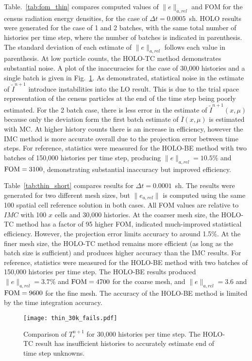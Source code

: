 Table.~\ref{tab:fom_thin} compares computed values of $\|e\|_{a,rel}$ and FOM for the census
radiation energy densities, for the case of $\Delta t =0.0005$~sh.   HOLO results were generated for the case of 1 and 2 batches, with the same
total number of histories per time step, where the number of batches is indicated in
parenthesis. The standard deviation of each estimate of $\|e\|_{a,rel}$ follows each value in parenthesis. 
At low particle counts, the HOLO-TC method demonstrates substantial noise.   
A plot
of the inaccuracies for the case of 30,000 histories and a single batch is given in
Fig.~\ref{fig:30k_fails}.  As demonstrated, statistical noise in the estimate of
$\tilde I^{n+1}$ introduce instabilities into the LO result.
This is due to the trial space representation of the
census particles at the end of the time step being poorly estimated.  For the 2 batch
case, there is less error in the estimate of $\tilde I^{n+1}(x,\mu)$ because only the
deviation form the first batch estimate of $\overline I(x,\mu)$ is estimated with MC. 
At higher history counts there is an increase in efficiency, however the IMC method is
more accurate overall due to the projection error between time steps.  For reference, statistics were measured for the HOLO-BE method with two batches of 150,000
histories per time step, producing $\|e\|_{a,rel}=10.5\%$ and $\text{FOM}=3100$, demonstrating
substantial inaccuracy but improved efficiency.

Table~\ref{tab:thin_short} compares results for $\Delta t = 0.0001$~sh.  The results were
generated for two different mesh sizes, but $\|e_{a,rel}\|$ is computed using the same 100
spatial cell reference solution in both cases.  All FOM values are relative to $IMC$ with
100 $x$ cells and 30,000 histories.  At the coarser mesh size, the HOLO-TC method has a
factor of 95 higher FOM, indicated much-improved statistical efficiency.  However, the projection error
limits accuracy to around 1.5$\%$.  At the finer mesh size, the
HOLO-TC method remains more efficient (as long as the batch size is sufficient) and produces higher accuracy than the IMC results.
For reference, statistics were measured for the HOLO-BE method with two batches of 150,000
histories per time step. The HOLO-BE results produced $\|e\|_{a,rel}=3.7\%$ and $\text{FOM}=4700$ for the
coarse mesh, and $\|e\|_{a,rel}=3.6$ and $\text{FOM}=9600$ for the fine mesh.  The accuracy of the HOLO-BE method
is limited by the time integration accuracy.
\begin{figure}
    \centering
    \texttt{[image: thin\_30k\_fails.pdf]}
    \caption{\label{fig:30k_fails}Comparison of $T_{r}^{n+1}$ for 30,000 histories per time step.  The HOLO-TC result has insufficient
histories to accurately estimate end of time step unknowns.}
\end{figure}

